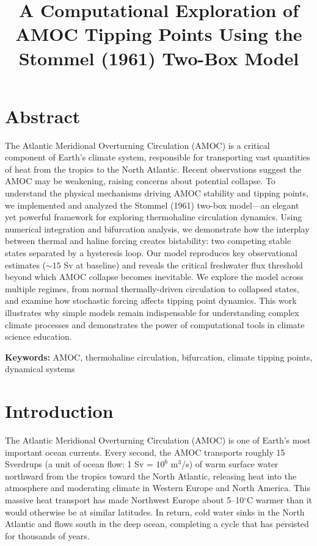 \documentclass[12pt,letterpaper]{article}
\title{A Computational Exploration of AMOC Tipping Points Using the Stommel (1961) Two-Box Model}
\author{}
\date{}
\begin{document}
\maketitle

\section*{Abstract}

The Atlantic Meridional Overturning Circulation (AMOC) is a critical component of Earth's climate system, responsible for transporting vast quantities of heat from the tropics to the North Atlantic. Recent observations suggest the AMOC may be weakening, raising concerns about potential collapse. To understand the physical mechanisms driving AMOC stability and tipping points, we implemented and analyzed the Stommel (1961) two-box model---an elegant yet powerful framework for exploring thermohaline circulation dynamics. Using numerical integration and bifurcation analysis, we demonstrate how the interplay between thermal and haline forcing creates bistability: two competing stable states separated by a hysteresis loop. Our model reproduces key observational estimates ($\sim 15$ Sv at baseline) and reveals the critical freshwater flux threshold beyond which AMOC collapse becomes inevitable. We explore the model across multiple regimes, from normal thermally-driven circulation to collapsed states, and examine how stochastic forcing affects tipping point dynamics. This work illustrates why simple models remain indispensable for understanding complex climate processes and demonstrates the power of computational tools in climate science education.

\noindent \textbf{Keywords:} AMOC, thermohaline circulation, bifurcation, climate tipping points, dynamical systems

\newpage
\tableofcontents
\newpage

\section{Introduction}

The Atlantic Meridional Overturning Circulation (AMOC) is one of Earth's most important ocean currents. Every second, the AMOC transports roughly 15 Sverdrups (a unit of ocean flow: 1 Sv = $10^6$ m$^3$/s) of warm surface water northward from the tropics toward the North Atlantic, releasing heat into the atmosphere and moderating climate in Western Europe and North America. This massive heat transport has made Northwest Europe about 5--10$^\circ$C warmer than it would otherwise be at similar latitudes. In return, cold water sinks in the North Atlantic and flows south in the deep ocean, completing a cycle that has persisted for thousands of years.
\end{document}

